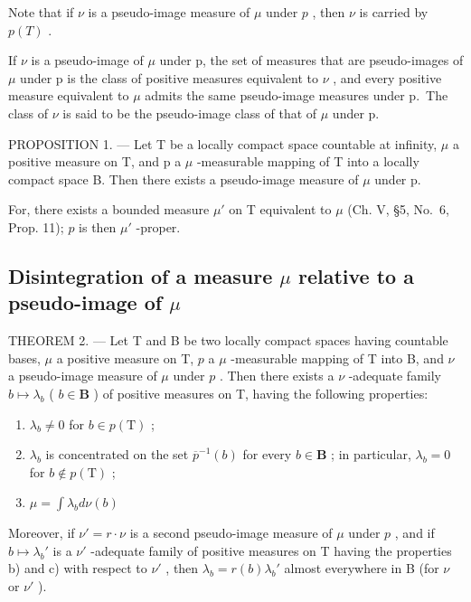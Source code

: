 Note that if \(\nu\) is a pseudo-image measure of \(\mu\) under \(p\) , then \(\nu\) is carried by \(p(T)\) .

If \(\nu\) is a pseudo-image of \(\mu\) under p, the set of measures that are pseudo-images of \(\mu\) under p is the class of positive measures equivalent to \(\nu\) , and every positive measure equivalent to \(\mu\) admits the same pseudo-image measures under p.~The class of \(\nu\) is said to be the pseudo-image class of that of \(\mu\) under p.

PROPOSITION 1. --- Let T be a locally compact space countable at infinity, \(\mu\) a positive measure on T, and p a \(\mu\) -measurable mapping of T into a locally compact space B. Then there exists a pseudo-image measure of \(\mu\) under p.

For, there exists a bounded measure \(\mu'\) on T equivalent to \(\mu\) (Ch. V, §5, No.~6, Prop. 11); \(p\) is then \(\mu'\) -proper.

\subsection{\texorpdfstring{Disintegration of a measure \(\mu\) relative to a pseudo-image of \(\mu\)}{Disintegration of a measure mu relative to a pseudo-image of mu}}

THEOREM 2. --- Let T and B be two locally compact spaces having countable bases, \(\mu\) a positive measure on T, \(p\) a \(\mu\) -measurable mapping of T into B, and \(\nu\) a pseudo-image measure of \(\mu\) under \(p\) . Then there exists a \(\nu\) -adequate family \(b \mapsto \lambda_b\) ( \(b \in \mathbf{B}\) ) of positive measures on T, having the following properties:

\begin{enumerate}
\def\labelenumi{\alph{enumi})}
\item
  \(\lambda_{b} \neq 0\) for \(b \in p(\mathrm{T})\) ;
\item
  \(\lambda_{b}\) is concentrated on the set \(\overline{p}^{-1}(b)\) for every \(b\in \mathbf{B}\) ; in particular, \(\lambda_{b} = 0\) for \(b\notin p(\mathrm{T})\) ;
\item
  \(\mu = \int \lambda_b d\nu(b)\)
\end{enumerate}

Moreover, if \(\nu' = r \cdot \nu\) is a second pseudo-image measure of \(\mu\) under \(p\) , and if \(b \mapsto \lambda_b'\) is a \(\nu'\) -adequate family of positive measures on T having the properties b) and c) with respect to \(\nu'\) , then \(\lambda_b = r(b)\lambda_b'\) almost everywhere in B (for \(\nu\) or \(\nu'\) ).


